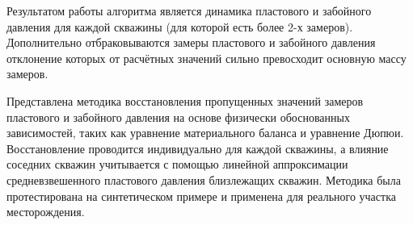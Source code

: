 \documentclass[14pt]{article}
\begin{document}
Результатом работы алгоритма является динамика пластового и забойного давления для каждой скважины (для которой есть более 2-х замеров). Дополнительно отбраковываются замеры пластового и забойного давления отклонение которых от расчётных значений сильно превосходит основную массу замеров.

Представлена методика восстановления пропущенных значений замеров пластового и забойного давления на основе физически обоснованных зависимостей, таких как уравнение материального баланса и уравнение Дюпюи. Восстановление проводится индивидуально для каждой скважины, а влияние соседних скважин учитывается с помощью линейной аппроксимации средневзвешенного пластового давления близлежащих скважин. Методика была протестирована на синтетическом примере и применена для реального участка месторождения.

\newpage
\end{document}
